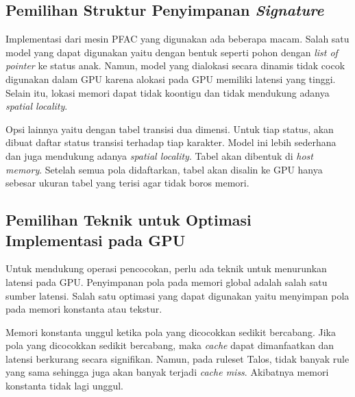     \subsection{Pemilihan Struktur Penyimpanan \emph{Signature}}

      Implementasi dari mesin PFAC yang digunakan ada beberapa macam. Salah satu model yang dapat digunakan yaitu dengan bentuk seperti pohon dengan \emph{list of pointer} ke status anak. Namun, model yang dialokasi secara dinamis tidak cocok digunakan dalam GPU karena alokasi pada GPU memiliki latensi yang tinggi. Selain itu, lokasi memori dapat tidak koontigu dan tidak mendukung adanya \emph{spatial locality}.
      
      Opsi lainnya yaitu dengan tabel transisi dua dimensi. Untuk tiap status, akan dibuat daftar status transisi terhadap tiap karakter. Model ini lebih sederhana dan juga mendukung adanya \emph{spatial locality}. Tabel akan dibentuk di \emph{host memory}. Setelah semua pola didaftarkan, tabel akan disalin ke GPU hanya sebesar ukuran tabel yang terisi agar tidak boros memori.



    \subsection{Pemilihan Teknik untuk Optimasi Implementasi pada GPU}

      Untuk mendukung operasi pencocokan, perlu ada teknik untuk menurunkan latensi pada GPU. Penyimpanan pola pada memori global adalah salah satu sumber latensi. Salah satu optimasi yang dapat digunakan yaitu menyimpan pola pada memori konstanta atau tekstur.

      Memori konstanta unggul ketika pola yang dicocokkan sedikit bercabang. Jika pola yang dicocokkan sedikit bercabang, maka \emph{cache} dapat dimanfaatkan dan latensi berkurang secara signifikan. Namun, pada ruleset Talos, tidak banyak rule yang sama sehingga juga akan banyak terjadi \emph{cache miss}. Akibatnya memori konstanta tidak lagi unggul. 
      
